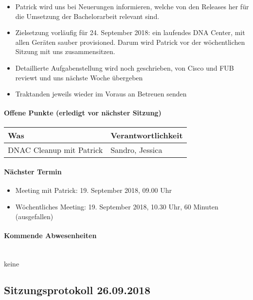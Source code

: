\begin{itemize}
\begin{itemize}
	\end{itemize}
	\item Patrick wird uns bei Neuerungen informieren, welche von den Releases her für die Umsetzung der Bachelorarbeit relevant sind.
	\item Zielsetzung vorläufig für 24. September 2018: ein laufendes DNA Center, mit allen Geräten sauber provisioned. Darum wird Patrick vor der wöchentlichen Sitzung mit uns zusammensitzen.
	\item Detaillierte Aufgabenstellung wird noch geschrieben, von Cisco und FUB reviewt und uns nächste Woche übergeben	
	\item Traktanden jeweils wieder im Voraus an Betreuen senden
\end{itemize}

\paragraph{Offene Punkte (erledigt vor nächster Sitzung)} \mbox{}
\begin{table}[H]
	\centering
	\begin{tabularx}{\textwidth}{X | p{4.5cm}}
		\rowcolor{gray!50}
		\textbf{Was} & \textbf{Verantwortlichkeit} \\
		\hline	
		DNAC Cleanup mit Patrick	& Sandro, Jessica \\	
	\end{tabularx}
	\label{tab:my-label}
\end{table}

\paragraph{Nächster Termin}
\begin{itemize}	
	\item Meeting mit Patrick: 19. September 2018, 09.00 Uhr
	\item Wöchentliches Meeting: 19. September 2018, 10.30 Uhr, 60 Minuten (ausgefallen)
\end{itemize}

\paragraph{Kommende Abwesenheiten} \mbox{}\\
keine

\newpage





\subsection{Sitzungsprotokoll 26.09.2018}

